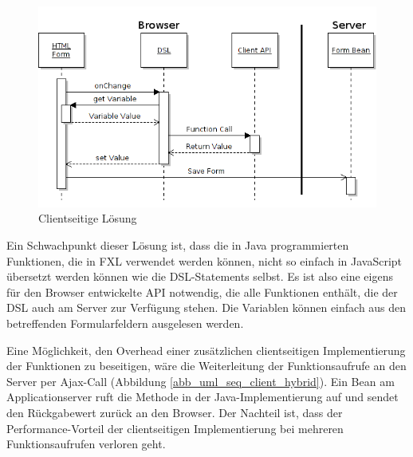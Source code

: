 \begin{figure}[th]
\begin{center}
\includegraphics[scale=0.55]{figures/uml_seq_client_neu}
\end{center}

\caption{Clientseitige Lösung}
\label{abb_uml_seq_client}
\end{figure}


Ein Schwachpunkt dieser Lösung ist, dass die in Java programmierten Funktionen, die in FXL verwendet werden können, nicht so einfach in Java\-Script übersetzt werden können wie die DSL-Statements selbst. Es ist also eine eigens für den Browser entwickelte API not\-wen\-dig, die alle Funktionen enthält, die der DSL auch am Server zur Verfügung stehen. Die Variablen können einfach aus den betreffenden Formularfeldern ausgelesen werden.

Eine Möglichkeit, den Overhead einer zusätzlichen clientseitigen Implementierung der Funktionen zu beseitigen, wäre die Weiterleitung der Funktionsaufrufe an den Server per Ajax-Call (Abbildung \ref{abb_uml_seq_client_hybrid}). Ein Bean am Applicationserver ruft die Methode in der Java-Implementierung auf und sendet den Rückgabewert zurück an den Browser. Der Nachteil ist, dass der Performance-Vorteil der clientseitigen Implementierung bei mehreren Funktionsaufrufen verloren geht.


